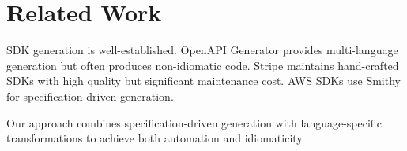 \section{Related Work}


SDK generation is well-established. OpenAPI Generator \cite{openapi2019} provides multi-language generation but often produces non-idiomatic code. Stripe \cite{stripe2019sdk} maintains hand-crafted SDKs with high quality but significant maintenance cost. AWS SDKs \cite{aws2019sdk} use Smithy for specification-driven generation.

Our approach combines specification-driven generation with language-specific transformations to achieve both automation and idiomaticity.

